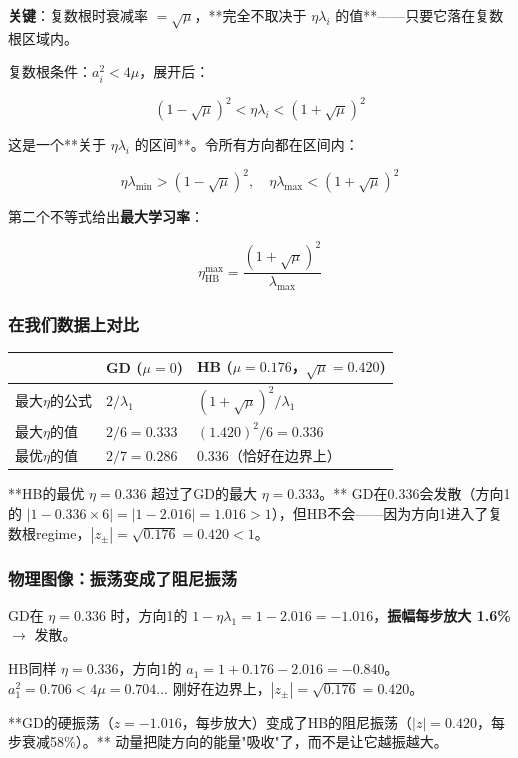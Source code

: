 \documentclass[12pt,a4paper]{article}
\begin{document}
\textbf{关键}：复数根时衰减率 $= \sqrt\mu$，**完全不取决于 $\eta\lambda_i$ 的值**——只要它落在复数根区域内。

复数根条件：$a_i^2 < 4\mu$，展开后：


\[(1-\sqrt\mu)^2 < \eta\lambda_i < (1+\sqrt\mu)^2\]

这是一个**关于 $\eta\lambda_i$ 的区间**。令所有方向都在区间内：


\[\eta\lambda_{\min} > (1-\sqrt\mu)^2, \quad \eta\lambda_{\max} < (1+\sqrt\mu)^2\]

第二个不等式给出\textbf{最大学习率}：


\[\eta^{\max}_{\text{HB}} = \frac{(1+\sqrt\mu)^2}{\lambda_{\max}}\]


\subsubsection{在我们数据上对比}






\begin{center}\small
\begin{longtable}{|l|l|l|}
\hline
 & GD ($\mu=0$) & HB ($\mu=0.176$，$\sqrt\mu=0.420$) \\
\hline
最大$\eta$的公式 & $2/\lambda_1$ & $(1+\sqrt\mu)^2/\lambda_1$ \\
最大$\eta$的值 & $2/6 = 0.333$ & $(1.420)^2/6 = 0.336$ \\
最优$\eta$的值 & $2/7 = 0.286$ & $0.336$（恰好在边界上） \\
\hline
\end{longtable}
\end{center}


**HB的最优 $\eta = 0.336$ 超过了GD的最大 $\eta = 0.333$。** GD在0.336会发散（方向1的 $|1-0.336\times6| = |1-2.016| = 1.016 > 1$），但HB不会——因为方向1进入了复数根regime，$|z_\pm| = \sqrt{0.176} = 0.420 < 1$。


\subsubsection{物理图像：振荡变成了阻尼振荡}

GD在 $\eta = 0.336$ 时，方向1的 $1-\eta\lambda_1 = 1-2.016 = -1.016$，\textbf{振幅每步放大 1.6\%} $\to$ 发散。

HB同样 $\eta = 0.336$，方向1的 $a_1 = 1+0.176-2.016 = -0.840$。$a_1^2 = 0.706 < 4\mu = 0.704$... 刚好在边界上，$|z_\pm| = \sqrt{0.176} = 0.420$。

**GD的硬振荡（$z = -1.016$，每步放大）变成了HB的阻尼振荡（$|z| = 0.420$，每步衰减58\%）。** 动量把陡方向的能量"吸收"了，而不是让它越振越大。
\end{document}
